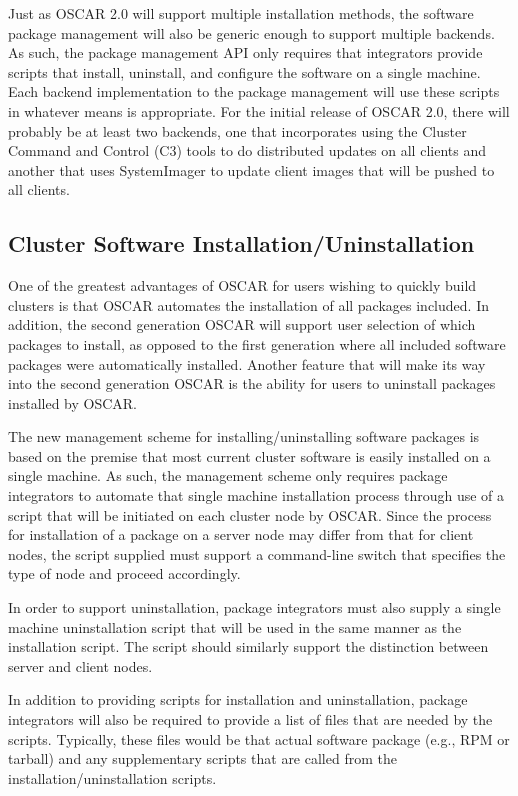Just as OSCAR 2.0 will support multiple installation methods, the
software package management will also be generic enough to support
multiple backends. As such, the package management API only requires
that integrators provide scripts that install, uninstall, and
configure the software on a single machine. Each backend
implementation to the package management will use these scripts in
whatever means is appropriate. For the initial release of OSCAR 2.0,
there will probably be at least two backends, one that incorporates
using the Cluster Command and Control (C3) tools to do distributed
updates on all clients and another that uses SystemImager to update
client images that will be pushed to all clients.

\subsection{Cluster Software Installation/Uninstallation}

One of the greatest advantages of OSCAR for users wishing to quickly
build clusters is that OSCAR automates the installation of all
packages included. In addition, the second generation OSCAR will
support user selection of which packages to install, as opposed to the
first generation where all included software packages were
automatically installed. Another feature that will make its way into
the second generation OSCAR is the ability for users to uninstall
packages installed by OSCAR.

The new management scheme for installing/uninstalling software
packages is based on the premise that most current cluster software is
easily installed on a single machine. As such, the management scheme
only requires package integrators to automate that single machine
installation process through use of a script that will be initiated on
each cluster node by OSCAR. Since the process for installation of a
package on a server node may differ from that for client nodes, the
script supplied must support a command-line switch that specifies the
type of node and proceed accordingly.

In order to support uninstallation, package integrators must also
supply a single machine uninstallation script that will be used in the
same manner as the installation script. The script should similarly
support the distinction between server and client nodes.

In addition to providing scripts for installation and uninstallation,
package integrators will also be required to provide a list of files
that are needed by the scripts.  Typically, these files would be that
actual software package (e.g., RPM or tarball) and any supplementary
scripts that are called from the installation/uninstallation scripts.

